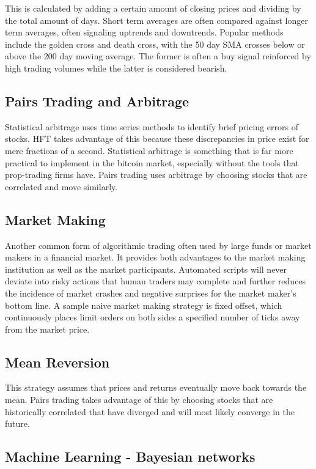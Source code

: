 \documentclass[letterpaper,11pt]{article}
\begin{document}
This is calculated by adding a certain amount of closing prices and dividing by the total amount of days. Short term averages are often compared against longer term averages, often signaling uptrends and downtrends. Popular methods include the golden cross and death cross, with the 50 day SMA crosses below or above the 200 day moving average. The former is often a buy signal reinforced by high trading volumes while the latter is considered bearish.
\subsection*{Pairs Trading and Arbitrage}

Statistical arbitrage uses time series methods to identify brief pricing errors of stocks. HFT takes advantage of this because these discrepancies in price exist for mere fractions of a second. Statistical arbitrage is something that is far more practical to implement in the bitcoin market, especially without the tools that prop-trading firms have. Pairs trading uses arbitrage by choosing stocks that are correlated and move similarly. 

\subsection*{Market Making}

Another common form of algorithmic trading often used by large funds or market makers in a financial market. It provides both advantages to the market making institution as well as the market participants. Automated scripts will never deviate into risky actions that human traders may complete and further reduces the incidence of market crashes and negative surprises for the market maker's bottom line. A sample naive market making strategy is fixed offset, which continuously places limit orders on both sides a specified number of ticks away from the market price.

\subsection*{Mean Reversion}

This strategy assumes that prices and returns eventually move back towards the mean. Pairs trading takes advantage of this by choosing stocks that are historically correlated that have diverged and will most likely converge in the future. 

\subsection*{Machine Learning - Bayesian networks}
\end{document}
